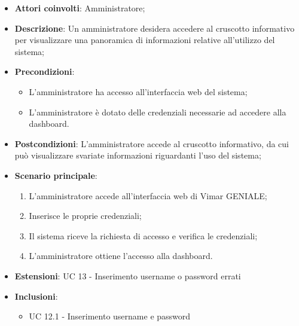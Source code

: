 \begin{itemize}
    \item \textbf{Attori coinvolti}: Amministratore;
    \item \textbf{Descrizione}: Un amministratore desidera accedere al cruscotto informativo per visualizzare una panoramica di informazioni relative all’utilizzo del sistema;
    \item \textbf{Precondizioni}: 
        \begin{itemize}
            \item L’amministratore ha accesso all’interfaccia web del sistema;
            \item L’amministratore è dotato delle credenziali necessarie ad accedere alla dashboard.
        \end{itemize}
    \item \textbf{Postcondizioni}: L’amministratore accede al cruscotto informativo, da cui può visualizzare svariate informazioni riguardanti l’uso del sistema;
    \item \textbf{Scenario principale}:
    \begin{enumerate}
    \item L’amministratore accede all’interfaccia web di Vimar GENIALE;
    \item Inserisce le proprie credenziali;
    \item Il sistema riceve la richiesta di accesso e verifica le credenziali;
    \item L’amministratore ottiene l’accesso alla dashboard.
    \end{enumerate}
    \item \textbf{Estensioni}: UC 13 - Inserimento username o password errati
    \item \textbf{Inclusioni}: 
        \begin{itemize}
            \item UC 12.1 - Inserimento username e password
        \end{itemize}
\end{itemize}

